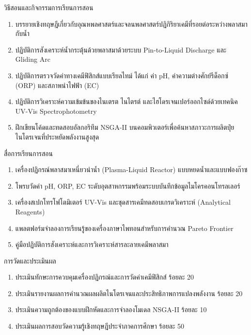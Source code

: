 \newpage

\begin{planbox}{วิธีสอนและกิจกรรมการเรียนการสอน}
\begin{enumerate}
    \item บรรยายเชิงทฤษฎีเกี่ยวกับอุณหพลศาสตร์และจลนพลศาสตร์ปฏิกิริยาเคมีที่รอยต่อระหว่างพลาสมากับน้ำ
    \item ปฏิบัติการสังเคราะห์น้ำกระตุ้นด้วยพลาสมาด้วยระบบ Pin-to-Liquid Discharge และ Gliding Arc
    \item ปฏิบัติการตรวจวัดค่าทางเคมีฟิสิกส์แบบเรียลไทม์ ได้แก่ ค่า pH, ค่าความต่างศักย์รีด็อกซ์ (ORP) และสภาพนำไฟฟ้า (EC)
    \item ปฏิบัติการวิเคราะห์ความเข้มข้นของไนเตรต ไนไตรต์ และไฮโดรเจนเปอร์ออกไซด์ด้วยเทคนิค UV-Vis Spectrophotometry
    \item ฝึกเขียนโค้ดและทดสอบอัลกอริทึม NSGA-II บนคอมพิวเตอร์เพื่อค้นหาสภาวะการผลิตปุ๋ยไนโตรเจนที่ประหยัดพลังงานสูงสุด
\end{enumerate}
\end{planbox}

\begin{planbox}{สื่อการเรียนการสอน}
\begin{enumerate}
    \item เครื่องปฏิกรณ์พลาสมาเหนี่ยวนำน้ำ (Plasma-Liquid Reactor) แบบหยดน้ำและแบบฟองก๊าซ
    \item โพรบวัดค่า pH, ORP, EC ระดับอุตสาหกรรมพร้อมระบบบันทึกข้อมูลไมโครคอนโทรลเลอร์
    \item เครื่องสเปกโทรโฟโตมิเตอร์ UV-Vis และชุดสารเคมีทดสอบเกรดวิเคราะห์ (Analytical Reagents)
    \item แพลตฟอร์มจำลองการเรียนรู้ของเครื่องภาษาไพทอนสำหรับการคำนวณ Pareto Frontier
    \item คู่มือปฏิบัติการสังเคราะห์และการวิเคราะห์สารละลายเคมีพลาสมา
\end{enumerate}
\end{planbox}

\begin{planbox}{การวัดและประเมินผล}
\begin{enumerate}
    \item ประเมินทักษะการควบคุมเครื่องปฏิกรณ์และการวัดค่าเคมีฟิสิกส์ ร้อยละ 20
    \item ประเมินรายงานผลการคำนวณผลผลิตไนโตรเจนและประสิทธิภาพการแปลงพลังงาน ร้อยละ 20
    \item ประเมินความถูกต้องของแบบฝึกหัดและการจำลองโมเดล NSGA-II ร้อยละ 10
    \item ประเมินผลการสอบวัดความรู้เชิงทฤษฎีประจำภาคการศึกษา ร้อยละ 50
\end{enumerate}
\end{planbox}

